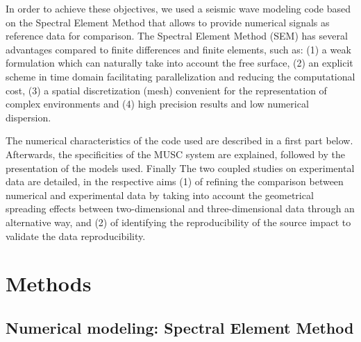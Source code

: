 \documentclass[manuscript,revised]{geophysics}
\newcommand{\twod}{two-dimensional }
\newcommand{\thrd}{three-dimensional }
\begin{document}
\noindent In order to achieve these objectives, we used a seismic wave modeling code based on the Spectral Element Method \citep{Komatitsch_SEM_1998,Komatitsch_ISM_1999,Komatitsch_SEM_2005,Festa_PML_2005} that allows to provide numerical signals as reference data for comparison. The Spectral Element Method (SEM) has several advantages compared to finite differences and finite elements, such as: (1) a weak formulation which can naturally take into account the free surface, (2) an explicit scheme in time domain facilitating parallelization and reducing the computational cost, (3) a spatial discretization (mesh) convenient for the representation of complex environments and (4) high precision results and low numerical dispersion.


\noindent The numerical characteristics of the code used are described in a first part below. Afterwards, the specificities of the MUSC system are explained, followed by the presentation of the models used. Finally The two coupled studies on experimental data are detailed, in the respective aims (1) of refining the comparison between numerical and experimental data by taking into account the geometrical spreading effects between \twod and \thrd data through an alternative way, and (2) of identifying the reproducibility of the source impact to validate the data reproducibility.


\section{Methods}

\subsection{Numerical modeling: Spectral Element Method}
\end{document}
